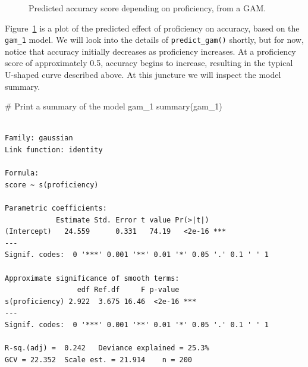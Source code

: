 \documentclass[
  letterpaper,
  DIV=11,
  numbers=noendperiod]{scrartcl}
\newenvironment{Shaded}{\begin{snugshade}}{\end{snugshade}}
\newcommand{\CommentTok}[1]{\textcolor[rgb]{0.37,0.37,0.37}{#1}}
\newcommand{\FunctionTok}[1]{\textcolor[rgb]{0.28,0.35,0.67}{#1}}
\newcommand{\NormalTok}[1]{\textcolor[rgb]{0.00,0.23,0.31}{#1}}
\begin{document}
\begin{figure}[H]


\caption{\label{fig-gam-1}Predicted accuracy score depending on
proficiency, from a GAM.}

\end{figure}%

Figure~\ref{fig-gam-1} is a plot of the predicted effect of proficiency
on accuracy, based on the \texttt{gam\_1} model. We will look into the
details of \texttt{predict\_gam()} shortly, but for now, notice that
accuracy initially decreases as proficiency increases. At a proficiency
score of approximately 0.5, accuracy begins to increase, resulting in
the typical U-shaped curve described above. At this juncture we will
inspect the model summary.

\begin{Shaded}
\begin{Highlighting}[]
\CommentTok{\# Print a summary of the model \textquotesingle{}gam\_1\textquotesingle{}}
\FunctionTok{summary}\NormalTok{(gam\_1)}
\end{Highlighting}
\end{Shaded}

\begin{verbatim}

Family: gaussian 
Link function: identity 

Formula:
score ~ s(proficiency)

Parametric coefficients:
            Estimate Std. Error t value Pr(>|t|)    
(Intercept)   24.559      0.331   74.19   <2e-16 ***
---
Signif. codes:  0 '***' 0.001 '**' 0.01 '*' 0.05 '.' 0.1 ' ' 1

Approximate significance of smooth terms:
                 edf Ref.df     F p-value    
s(proficiency) 2.922  3.675 16.46  <2e-16 ***
---
Signif. codes:  0 '***' 0.001 '**' 0.01 '*' 0.05 '.' 0.1 ' ' 1

R-sq.(adj) =  0.242   Deviance explained = 25.3%
GCV = 22.352  Scale est. = 21.914    n = 200
\end{verbatim}
\end{document}
